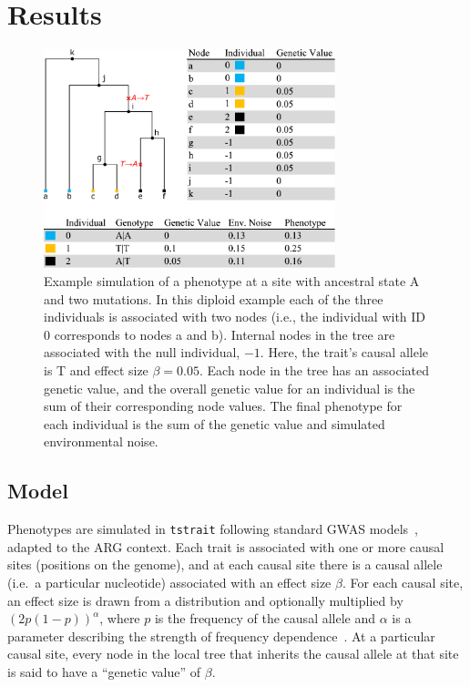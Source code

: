 \documentclass[unnumsec,webpdf,modern,large,namedate]{oup-authoring-template}%
\begin{document}
\section{Results}
\begin{figure}[t]%
\centering
\includegraphics[width=240pt]{figures/tree-illustration.pdf}
\caption{Example simulation of a phenotype at a site with ancestral state A and
two mutations. In this diploid example each of the three individuals
is associated with two nodes (i.e., the individual with ID 0 corresponds
to nodes \textsf{a} and \textsf{b}). Internal nodes in the tree are associated
with the null individual, $-1$. Here, the trait's causal allele is T
and effect size $\beta=0.05$. Each node in the tree has an associated
genetic value, and the overall genetic value for an individual is the
sum of their corresponding node values. The final phenotype
for each individual is the sum of the genetic value and
simulated environmental noise.
\label{fig:tree-illustration}}
\end{figure}

\subsection{Model}
Phenotypes are simulated in \texttt{tstrait} following standard
GWAS models~\citep{uffelmann2021}, adapted to the ARG context.
Each trait is associated with one or more causal sites
(positions on the genome), and at each causal site there is a causal allele
(i.e.\ a particular nucleotide) associated with an effect size $\beta$.
For each causal site, an effect size is drawn from a distribution
and optionally multiplied by $\left(2p(1-p)\right)^\alpha$,
where $p$ is the frequency of the causal allele and $\alpha$
is a parameter describing the strength of
frequency dependence~\citep{speed2017}.
At a particular causal site, every node in the local tree that inherits
the causal allele at that site is said to have a ``genetic value'' of $\beta$.
\end{document}
